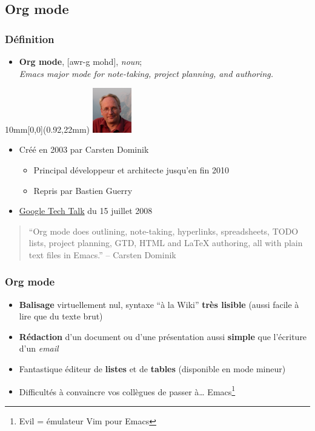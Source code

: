 \documentclass[presentation,t,hideothersubsections]{beamer}
\newcommand\putpic[5]{%
\begin{textblock}{#3}(#1,#2)
\texttt{[image: \#5]}
\end{textblock}
}
\begin{document}
\subsection{Org mode}
\label{sec-1-2}
\begin{frame}
\frametitle{Définition}
\label{sec-1-2-1}


\begin{itemize}
\item \textbf{Org mode}, [awr-g mohd], \emph{noun}; \\
\emph{Emacs major mode for note-taking, project planning, and authoring.}
\end{itemize}

\pause




\begin{textblock*}{10mm}[0,0](0.92\textwidth,22mm)
    \includegraphics[width=17mm]{Carsten.png}
\end{textblock*}


\begin{itemize}
\item Créé en 2003 par Carsten Dominik
\begin{itemize}
\item Principal développeur et architecte jusqu'en fin 2010
\item Repris par Bastien Guerry
\end{itemize}
\item \href{http://orgmode.org/worg/org-tutorials/org-screencasts/org-mode-google-tech-talk.html}{Google Tech Talk} du 15 juillet 2008
\end{itemize}

\begin{quote}
``Org mode does outlining, note-taking, hyperlinks, spreadsheets, TODO lists,
project planning, GTD, HTML and \LaTeX{} authoring, all with plain text files in
Emacs.'' -- Carsten Dominik
\end{quote}
\end{frame}
\begin{frame}
\frametitle{Org mode}
\label{sec-1-2-2}


\begin{itemize}
\item \textbf{Balisage} virtuellement nul, syntaxe ``à la Wiki'' \textbf{très lisible} (aussi facile à
  lire que du texte brut)
\item \textbf{Rédaction} d'un document ou d'une présentation aussi \textbf{simple} que l'écriture
  d'un \emph{email}
\item Fantastique éditeur de \textbf{listes} et de \textbf{tables} (disponible en mode mineur)
\item Difficultés à convaincre vos collègues de passer à\ldots{} Emacs\footnote{Evil = émulateur Vim pour Emacs
 }
\end{itemize}
\end{frame}
\end{document}
